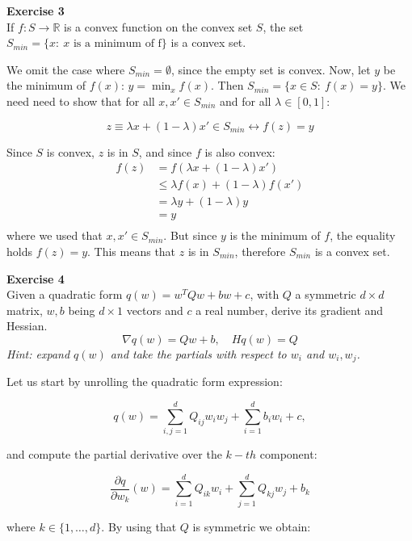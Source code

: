 \documentclass[11pt,table]{article}
\newenvironment{problem}[2][Exercise]
    { \begin{mdframed}[backgroundcolor=gray!20] \textbf{#1 #2} \\}
    {  \end{mdframed}}
\begin{document}
\begin{problem}{3}
If \( f: S \to \mathbb{R} \) is a convex function on the convex set \( S \), the set \( S_{min} = \{x : \ x \text{ is a minimum of f} \} \) is a convex set.
\end{problem}

We omit the case where \(S_{min} = \emptyset\), since the empty set is convex. Now, let \(y\) be the minimum of \(f(x)\): \(y = \min_x f(x)\). Then \( S_{min} = \{x \in S : \ f(x) = y \} \). We need need to show that for all \(x, x' \in S_{min}\) and for all \(\lambda \in [0,1]\):

\[
  z \equiv \lambda x + (1-\lambda) x' \in S_{min} \leftrightarrow f(z) = y
\]

Since \(S\) is convex, \(z\) is in \(S\), and since \(f\) is also convex:
\begin{align*}
  f(z) & = f\left(\lambda x + (1-\lambda) x'\right) \\
       & \leq \lambda f(x) + (1-\lambda) f(x')      \\
       & = \lambda y + (1-\lambda) y                \\
       & = y                                        \\
\end{align*}
where we used that \(x, x'\in S_{min}\). But since \(y\) is the minimum of \(f\), the equality holds \(f(z) = y\). This means that \(z\) is in \(S_{min}\), therefore \(S_{min}\) is a convex set.

\begin{problem}{4}
Given a quadratic form \( q(w) = w^TQw + bw + c \), with \( Q \) a symmetric \( d\times d \) matrix, \( w,b\) being \(d\times 1 \) vectors and \( c \) a real number, derive its gradient and Hessian.
\[
  \nabla q(w) = Qw + b, \quad Hq(w) = Q
\]
\emph{Hint: expand \(q(w)\) and take the partials with respect to \(w_i\) and \(w_i,w_j\).}
\end{problem}

Let us start by unrolling the quadratic form expression:

\[
  q(w) = \sum_{i,j=1}^{d} Q_{ij} w_{i}w_{j} + \sum_{i=1}^{d}b_{i}w_{i} + c,
\]

and compute the partial derivative over the \(k-th\) component:

\[
  \frac{\partial q}{\partial w_k} (w) = \sum_{i=1}^{d} Q_{ik} w_{i} + \sum_{j=1}^{d} Q_{kj} w_{j} + b_{k}
\]

where \(k \in \{1, \ldots, d\}\). By using that \(Q\) is symmetric we obtain:
\end{document}

